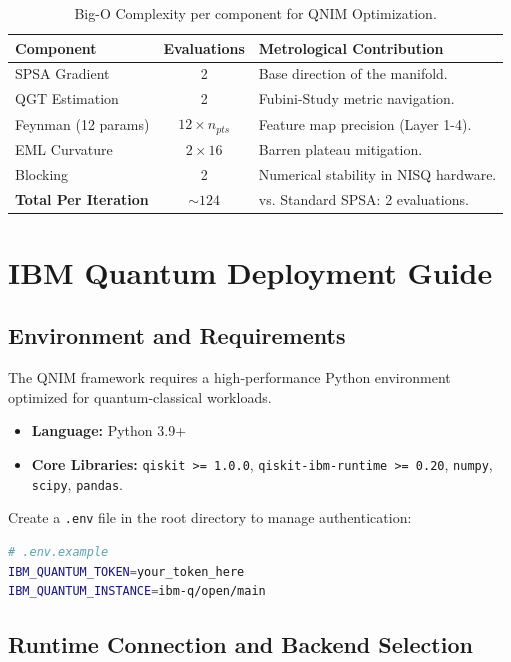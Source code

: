 \documentclass[11pt,a4paper,spanish]{book}
\numberwithin{equation}{chapter}
\numberwithin{figure}{chapter}
\numberwithin{equation}{chapter}
\numberwithin{figure}{chapter}
\numberwithin{table}{chapter}
\begin{document}
\begin{table}[h]
\centering
\caption{Big-O Complexity per component for QNIM Optimization.}
\begin{tabular}{@{}lcl@{}}
\toprule
\textbf{Component} & \textbf{Evaluations} & \textbf{Metrological Contribution} \\ \midrule
SPSA Gradient & 2 & Base direction of the manifold. \\
QGT Estimation & 2 & Fubini-Study metric navigation. \\
Feynman (12 params) & $12 \times n_{pts}$ & Feature map precision (Layer 1-4). \\
EML Curvature & $2 \times 16$ & Barren plateau mitigation. \\
Blocking & 2 & Numerical stability in NISQ hardware. \\ \midrule
\textbf{Total Per Iteration} & $\sim 124$ & vs. Standard SPSA: 2 evaluations. \\ \bottomrule
\end{tabular}
\end{table}

\chapter{IBM Quantum Deployment Guide}
\label{app:deployment}

\section{Environment and Requirements}

The QNIM framework requires a high-performance Python environment optimized for quantum-classical workloads.
\begin{itemize}
    \item \textbf{Language:} Python 3.9+
    \item \textbf{Core Libraries:} \texttt{qiskit >= 1.0.0}, \texttt{qiskit-ibm-runtime >= 0.20}, \texttt{numpy}, \texttt{scipy}, \texttt{pandas}.
\end{itemize}

Create a \texttt{.env} file in the root directory to manage authentication:
\begin{lstlisting}[language=bash]
# .env.example
IBM_QUANTUM_TOKEN=your_token_here
IBM_QUANTUM_INSTANCE=ibm-q/open/main
\end{lstlisting}

\section{Runtime Connection and Backend Selection}
\end{document}
